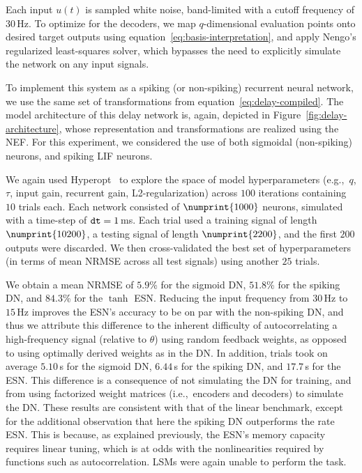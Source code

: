 Each input $u(t)$ is sampled white noise, band-limited with a cutoff frequency of $30$\,Hz.
To optimize for the decoders, we map $q$-dimensional evaluation points onto desired target outputs using equation~\ref{eq:basis-interpretation}, and apply Nengo's regularized least-squares solver, which bypasses the need to explicitly simulate the network on any input signals.

To implement this system as a spiking (or non-spiking) recurrent neural network, we use the same set of transformations from equation~\ref{eq:delay-compiled}. %
The model architecture of this delay network is, again, depicted in Figure~\ref{fig:delay-architecture}, whose representation and transformations are realized using the NEF.
For this experiment, we considered the use of both sigmoidal (non-spiking) neurons, and spiking LIF neurons.

We again used Hyperopt~\citep{bergstra2015hyperopt} to explore the space of model hyperparameters (e.g.,~$q$, $\tau$, input gain, recurrent gain, L2-regularization) across $100$ iterations containing $10$ trials each.
Each network consisted of $\numprint{1000}$ neurons, simulated with a time-step of $\texttt{dt}{} = 1$\,ms.
Each trial used a training signal of length $\numprint{10200}$, a testing signal of length $\numprint{2200}$, and the first $200$ outputs were discarded.
We then cross-validated the best set of hyperparameters (in terms of mean NRMSE across all test signals) using another $25$ trials.

We obtain a mean NRMSE of $5.9$\% for the sigmoid DN, $51.8$\% for the spiking DN, and $84.3$\% for the $\tanh$ ESN.
Reducing the input frequency from $30$\,Hz to $15$\,Hz improves the ESN's accuracy to be on par with the non-spiking DN, and thus we attribute this difference to the inherent difficulty of autocorrelating a high-frequency signal (relative to $\theta$) using random feedback weights, as opposed to using optimally derived weights as in the DN.
In addition, trials took on average $5.10$\,s for the sigmoid DN, $6.44$\,s for the spiking DN, and $17.7$\,s for the ESN.
This difference is a consequence of not simulating the DN for training, and from using factorized weight matrices (i.e.,~encoders and decoders) to simulate the DN.
These results are consistent with that of the linear benchmark, except for the additional observation that here the spiking DN outperforms the rate ESN.
This is because, as explained previously, the ESN's memory capacity requires linear tuning, which is at odds with the nonlinearities required by functions such as autocorrelation.
LSMs were again unable to perform the task.

